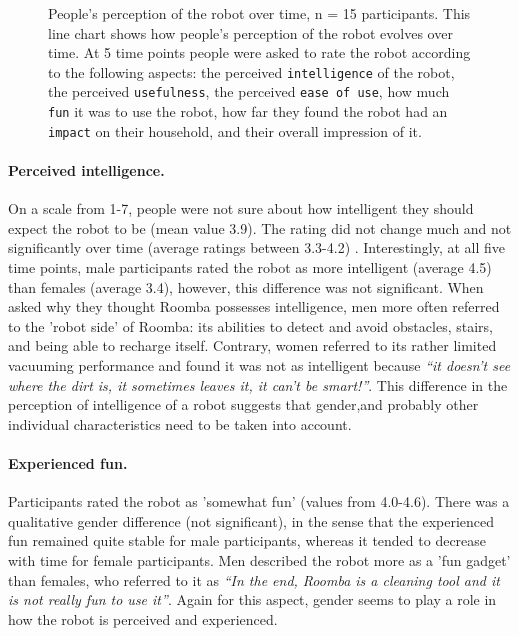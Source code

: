 \documentclass{frontiersSCNS} %
\begin{document}
\begin{figure}


    \caption{People's perception of the robot over time, n = 15 participants.
    This line chart shows how people's perception of the robot evolves over
    time. At 5 time points people were asked to rate the robot according to the
    following aspects: the perceived \texttt{intelligence} of the robot, the
    perceived \texttt{usefulness}, the perceived \texttt{ease of use}, how much
    \texttt{fun} it was to use the robot, how far they found the robot had an
    \texttt{impact} on their household, and their {overall} impression of it.}

    \label{fig:roomba-perception}
\end{figure}

\paragraph*{Perceived intelligence.} On a scale from 1-7, people were not sure
about how intelligent they should expect the robot to be (mean value 3.9). The
rating did not change much and not significantly over time (average ratings
between 3.3-4.2) \citep{fink_living_2013}. Interestingly, at all five time
points, male participants rated the robot as more intelligent (average 4.5) than
females (average 3.4), however, this difference was not significant. When asked
why they thought Roomba possesses intelligence, men more often referred to the
'robot side' of Roomba: its abilities to detect and avoid obstacles, stairs, and
being able to recharge itself. Contrary, women referred to its rather limited
vacuuming performance and found it was not as intelligent because \textit{``it
doesn't see where the dirt is, it sometimes leaves it, it can't be smart!''}.
This difference in the perception of intelligence of a robot suggests that
gender,and probably other individual characteristics need to be taken into
account.

\paragraph*{Experienced fun.} Participants rated the robot as 'somewhat fun'
(values from 4.0-4.6). There was a qualitative gender difference (not
significant), in the sense that the experienced fun remained quite stable for
male participants, whereas it tended to decrease with time for female
participants. Men described the robot more as a 'fun gadget' than females, who
referred to it as \textit{``In the end, Roomba is a cleaning tool and it is not
really fun to use it''}. Again for this aspect, gender seems to play a role in
how the robot is perceived and experienced.\\
\end{document}
